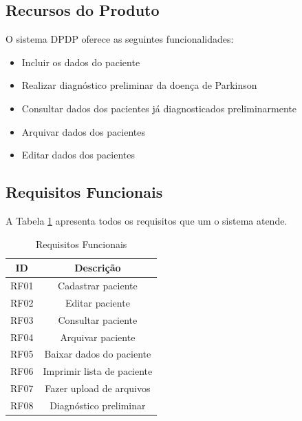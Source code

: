 \begin{anexosenv}
    \subsection{Recursos do Produto}

    O sistema DPDP oferece as seguintes funcionalidades:

    \begin{itemize}
        \item Incluir os dados do paciente
        \item Realizar diagnóstico preliminar da doença de Parkinson
        \item Consultar dados dos pacientes já diagnosticados preliminarmente
        \item Arquivar dados dos pacientes
        \item Editar dados dos pacientes
    \end{itemize}

    \subsection{Requisitos Funcionais}

    A Tabela \ref{table:Requisitos Funcionais} apresenta todos os requisitos que um o sistema atende.

    \begin{table}[ht!]
        \centering
        \caption{Requisitos Funcionais}
        \begin{tabular}{@{}|c|c|@{}}
            \hline
            \textbf{ID} & \textbf{Descrição}         \\ \hline
            RF01        & Cadastrar paciente         \\ \hline
            RF02        & Editar paciente            \\ \hline
            RF03        & Consultar paciente         \\ \hline
            RF04        & Arquivar paciente          \\ \hline
            RF05        & Baixar dados do paciente   \\ \hline
            RF06        & Imprimir lista de paciente \\ \hline
            RF07        & Fazer upload de arquivos   \\ \hline
            RF08        & Diagnóstico preliminar     \\ \hline
        \end{tabular}
        \label{table:Requisitos Funcionais}
    \end{table}


\end{anexosenv}